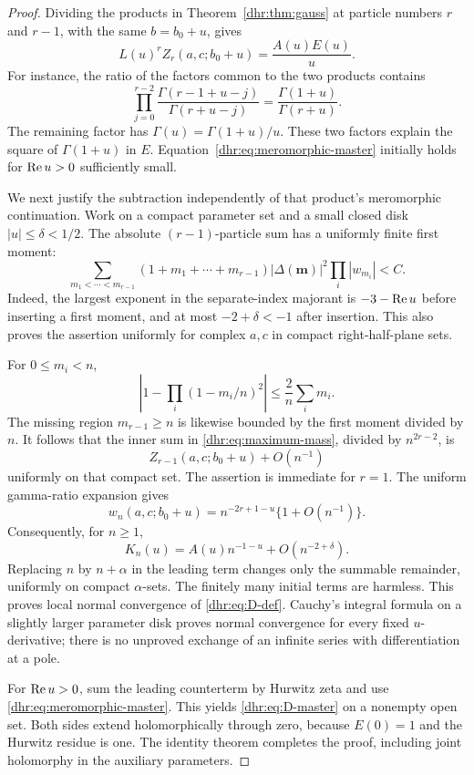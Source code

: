 \begin{proof}
Dividing the products in Theorem~\ref{dhr:thm:gauss} at particle
numbers $r$ and $r-1$, with the same $b=b_0+u$, gives
\begin{equation}\label{dhr:eq:meromorphic-master}
 L(u)^r Z_r(a,c;b_0+u)=\frac{A(u)E(u)}u.
\end{equation}
For instance, the ratio of the factors common to the two products
contains
\[
 \prod_{j=0}^{r-2}
 \frac{\Gamma(r-1+u-j)}{\Gamma(r+u-j)}
 =\frac{\Gamma(1+u)}{\Gamma(r+u)}.
\]
The remaining factor has $\Gamma(u)=\Gamma(1+u)/u$. These two
factors explain the square of $\Gamma(1+u)$ in $E$.
Equation~\eqref{dhr:eq:meromorphic-master} initially holds for
$\operatorname{Re} u>0$ sufficiently small.

We next justify the subtraction independently of that product's
meromorphic continuation. Work on a compact parameter set and a small
closed disk $|u|\leq\delta<1/2$. The absolute $(r-1)$-particle sum
has a uniformly finite first moment:
\begin{equation}\label{dhr:eq:lower-first-moment}
 \sum_{m_1<\cdots<m_{r-1}}
 (1+m_1+\cdots+m_{r-1})
 |\Delta(\bm m)|^2\prod_i|w_{m_i}|<C.
\end{equation}
Indeed, the largest exponent in the separate-index majorant is
$-3-\operatorname{Re} u$ before inserting a first moment, and at most
$-2+\delta<-1$ after insertion. This also proves the assertion
uniformly for complex $a,c$ in compact right-half-plane sets.

For $0\leq m_i<n$,
\[
 \left|1-\prod_i(1-m_i/n)^2\right|
 \leq\frac{2}{n}\sum_i m_i.
\]
The missing region $m_{r-1}\geq n$ is likewise bounded by the first
moment divided by $n$. It follows that the inner sum in
\eqref{dhr:eq:maximum-mass}, divided by $n^{2r-2}$, is
\[
 Z_{r-1}(a,c;b_0+u)+O(n^{-1})
\]
uniformly on that compact set. The assertion is immediate for $r=1$.
The uniform gamma-ratio expansion gives
\[
 w_n(a,c;b_0+u)=n^{-2r+1-u}\{1+O(n^{-1})\}.
\]
Consequently, for $n\geq1$,
\begin{equation}\label{dhr:eq:asymptotic-mass}
 K_n(u)=A(u)n^{-1-u}+O(n^{-2+\delta}).
\end{equation}
Replacing $n$ by $n+\alpha$ in the leading term changes only the
summable remainder, uniformly on compact $\alpha$-sets. The finitely
many initial terms are harmless. This proves local normal convergence
of \eqref{dhr:eq:D-def}. Cauchy's integral formula on a slightly
larger parameter disk proves normal convergence for every fixed
$u$-derivative; there is no unproved exchange of an infinite series
with differentiation at a pole.

For $\operatorname{Re} u>0$, sum the leading counterterm by Hurwitz zeta and use
\eqref{dhr:eq:meromorphic-master}. This yields
\eqref{dhr:eq:D-master} on a nonempty open set. Both sides extend
holomorphically through zero, because $E(0)=1$ and the Hurwitz residue
is one. The identity theorem completes the proof, including joint
holomorphy in the auxiliary parameters.
\end{proof}

